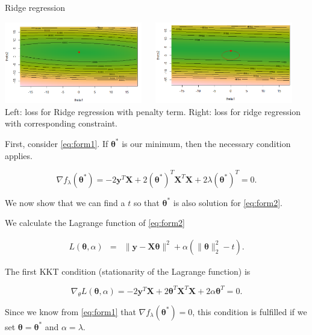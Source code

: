 \begin{vbframe}{Ridge regression}
\lz

\begin{center}
\includegraphics[width = 0.45\textwidth]{figure_man/ridge_formulation1.png} ~~ \includegraphics[width = 0.45\textwidth]{figure_man/ridge_formulation2.png} \\
Left: loss for Ridge regression with penalty term. Right: loss for ridge regression with corresponding constraint.
\end{center}


\framebreak

First, consider \eqref{eq:form1}. If $\bm{\theta}^*$ is our minimum, then the necessary condition applies.

$$
\nabla f_\lambda(\bm{\theta}^*) = - 2 \bm{y}^T\mathbf{X} + 2 (\bm{\theta}^*)^T \mathbf{X}^T\mathbf{X} + 2 \lambda (\bm{\theta}^*)^T = 0.
$$

We now show that we can find a $t$ so that $\bm{\theta}^*$ is also solution for \eqref{eq:form2}.

\lz

We calculate the Lagrange function of \eqref{eq:form2}

\vspace*{-0.5cm}
\begin{eqnarray*}
  L(\bm{\theta}, \alpha) &=& \|\bm{y} - \mathbf{X}\bm{\theta}\|^2 + \alpha (\|\bm{\theta}\|^2_2 - t).
\end{eqnarray*}

The first KKT condition (stationarity of the Lagrange function) is

$$
\nabla_\theta L(\bm{\theta}, \alpha)= - 2\bm{y}^T\mathbf{X} + 2 \bm{\theta}^T \mathbf{X}^T\mathbf{X} + 2 \alpha \bm{\theta}^T = 0.
$$

Since we know from \eqref{eq:form1} that $\nabla f_\lambda(\bm{\theta}^*) = 0$, this condition is fulfilled if we set $\bm{\theta} = \bm{\theta}^*$ and $\alpha = \lambda$.


\end{vbframe}
